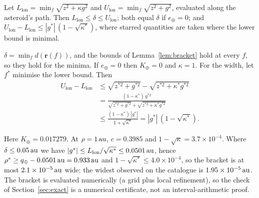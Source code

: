 \begin{corollary}\label{cor:bracket}
Let $L_{\mathrm{lon}} = \min_f\sqrt{z^2 + \kappa g^2}$ and $U_{\mathrm{lon}} = \min_f\sqrt{z^2 + g^2}$, evaluated along the asteroid's path. Then $L_{\mathrm{lon}} \le \delta \le U_{\mathrm{lon}}$; both equal $\delta$ if $e_\oplus = 0$; and $U_{\mathrm{lon}} - L_{\mathrm{lon}} \le |g^*|\,(1 - \sqrt{\kappa^*})$, where starred quantities are taken where the lower bound is minimal.
\end{corollary}
\begin{IEEEproof}
$\delta = \min_f d(\mathbf{r}(f))$, and the bounds of Lemma~\ref{lem:bracket} hold at every $f$, so they hold for the minima. If $e_\oplus = 0$ then $K_\oplus = 0$ and $\kappa = 1$. For the width, let $f^*$ minimise the lower bound. Then
\begin{align*}
U_{\mathrm{lon}} - L_{\mathrm{lon}} &\le \sqrt{z^{*2} + g^{*2}} - \sqrt{z^{*2} + \kappa^* g^{*2}} \\
&= \frac{(1 - \kappa^*)\,g^{*2}}{\sqrt{z^{*2} + g^{*2}} + \sqrt{z^{*2} + \kappa^* g^{*2}}} \\
&\le \frac{(1 - \kappa^*)\,|g^*|}{1 + \sqrt{\kappa^*}} = |g^*|\,(1 - \sqrt{\kappa^*}).
\end{align*}
\end{IEEEproof}
Here $K_\oplus = 0.017279$. At $\rho = 1\,\mathrm{au}$, $c = 0.3985$ and $1 - \sqrt{\kappa} = 3.7\times10^{-4}$. Where $\delta \le 0.05\,\mathrm{au}$ we have $|g^*| \le L_{\mathrm{lon}}/\sqrt{\kappa^*} \le 0.0501\,\mathrm{au}$, hence $\rho^* \ge q_\oplus - 0.0501\,\mathrm{au} = 0.933\,\mathrm{au}$ and $1 - \sqrt{\kappa^*} \le 4.0\times10^{-4}$, so the bracket is at most $2.1\times10^{-5}\,\mathrm{au}$ wide; the widest observed on the catalogue is $1.95\times10^{-5}\,\mathrm{au}$. The bracket is evaluated numerically (a grid plus local refinement), so the check of Section~\ref{sec:exact} is a numerical certificate, not an interval-arithmetic proof.


